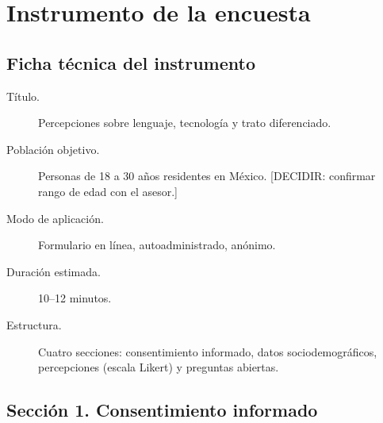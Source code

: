 \chapter{Instrumento de la encuesta}
\label{ap:encuesta}

\section*{Ficha técnica del instrumento}

\begin{description}
  \item[Título.] Percepciones sobre lenguaje, tecnología y trato diferenciado.
  \item[Población objetivo.] Personas de 18 a 30 años residentes en México.
    [DECIDIR: confirmar rango de edad con el asesor.]
  \item[Modo de aplicación.] Formulario en línea, autoadministrado, anónimo.
  \item[Duración estimada.] 10--12 minutos.
  \item[Estructura.] Cuatro secciones: consentimiento informado, datos
    sociodemográficos, percepciones (escala Likert) y preguntas abiertas.
\end{description}

\section*{Sección 1. Consentimiento informado}

